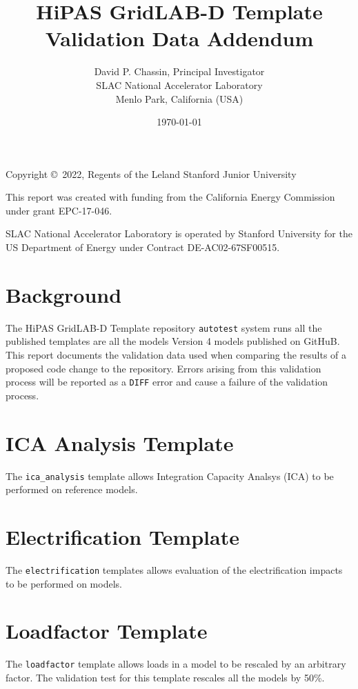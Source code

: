 \documentclass{article}
\title
{
	HiPAS GridLAB-D Template Validation Data Addendum
}
\author
{
	David P. Chassin, Principal Investigator
\\
	SLAC National Accelerator Laboratory
\\
	Menlo Park, California (USA) 
}
\date { \today }
\def\code#1{\texttt{#1}}
\begin{document}
\maketitle

{
	\center 
	
	Copyright \copyright\ 2022, Regents of the Leland Stanford Junior University

\vspace{1cm}

	This report was created with funding from the California Energy Commission under grant EPC-17-046.

\vspace{1cm}

	SLAC National Accelerator Laboratory is operated by Stanford University for the US Department of Energy
	under Contract DE-AC02-67SF00515.
}

\newpage

\tableofcontents

\newpage

\listoftables

\newpage

\section{Background}

The HiPAS GridLAB-D Template repository \code{autotest} system runs all the published templates are all the models Version 4 models published on GitHuB. This report documents the validation data used when comparing the results of a proposed code change to the repository. Errors arising from this validation process will be reported as a \code{DIFF} error and cause a failure of the validation process.

\section{ICA Analysis Template}

The \code{ica\_analysis} template allows Integration Capacity Analsys (ICA) to be performed on reference models. 




\section{Electrification Template}

The \code{electrification} templates allows evaluation of the electrification impacts to be performed on models.




\section{Loadfactor Template}

The \code{loadfactor} template allows loads in a model to be rescaled by an arbitrary factor. The validation test for this template rescales all the models by 50\%.


\end{document}
